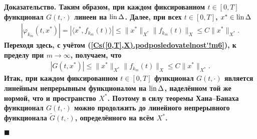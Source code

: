 \documentclass{report}
\newenvironment{Proof}{\par\noindent\bf Доказательство.\rm}{ $\blacksquare$\par}
\newcommand{\lin}{\mathop{\rm lin}\nolimits}
\begin{document}
\begin{Proof}
Таким образом, при каждом фиксированном $t\in[0,T]$ функционал $G(t,\cdot)$ линеен на $\lin\Delta$. Далее, при всех $t\in[0,T]$,
$x^*\in\lin\Delta$
\begin{gather*}
|\varphi_{k_m}(t,x^*)|=|\langle x^*,f_{k_m}(t)\rangle|\leqslant\|x^*\|_{X^*}\|f_{k_m}(t)\|_X\leqslant C\|x^*\|_{X^*}.
\end{gather*}
Переходя здесь, с учётом (\ref{Cs([0,T],X).podposledovatelnost'!m6}), к пределу при $m\to\infty$, получаем, что
\begin{gather*}
|G(t,x^*)|\leqslant\|x^*\|_{X^*}\|f_{k_m}(t)\|_X\leqslant C\|x^*\|_{X^*}.
\end{gather*}
Итак, при каждом фиксированном $t\in[0,T]$ функционал $G(t,\cdot)$ является линейным непрерывным функционалом на $\lin\Delta$, наделённом
той же нормой, что и пространство $X^*$. Поэтому в силу теоремы Хана--Банаха функционал $G(t,\cdot)$ можно продолжить до линейного
непрерывного функционала $\tilde G(t,\cdot)$, определённого на всём $X^*$.


\end{Proof}
\end{document}
